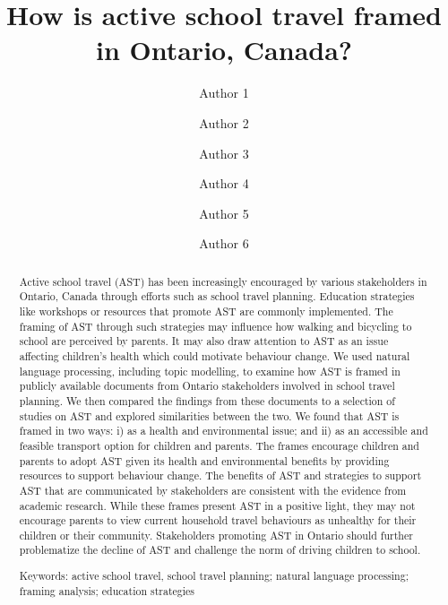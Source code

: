 \documentclass[]{elsarticle} %
\begin{document}
\begin{frontmatter}

  \title{How is active school travel framed in Ontario, Canada?}
    \author[Some Department]{Author 1}
    \author[Some Department]{Author 2}
    \author[Another University]{Author 3}
    \author[Some Institute]{Author 4}
    \author[Some University]{Author 5}
    \author[Some Department]{Author 6}
      \address[Some Department]{Department, Street, City, Province,
Postal Code}
    \address[Another University]{Department, Street, City, Province,
Postal Code}
    \address[Some Institute]{Street, City, Province, Postal Code}
    \address[Some University]{Department, Street, City, Province, Postal
Code}
  
  \begin{abstract}
  Active school travel (AST) has been increasingly encouraged by various
  stakeholders in Ontario, Canada through efforts such as school travel
  planning. Education strategies like workshops or resources that
  promote AST are commonly implemented. The framing of AST through such
  strategies may influence how walking and bicycling to school are
  perceived by parents. It may also draw attention to AST as an issue
  affecting children's health which could motivate behaviour change. We
  used natural language processing, including topic modelling, to
  examine how AST is framed in publicly available documents from Ontario
  stakeholders involved in school travel planning. We then compared the
  findings from these documents to a selection of studies on AST and
  explored similarities between the two. We found that AST is framed in
  two ways: i) as a health and environmental issue; and ii) as an
  accessible and feasible transport option for children and parents. The
  frames encourage children and parents to adopt AST given its health
  and environmental benefits by providing resources to support behaviour
  change. The benefits of AST and strategies to support AST that are
  communicated by stakeholders are consistent with the evidence from
  academic research. While these frames present AST in a positive light,
  they may not encourage parents to view current household travel
  behaviours as unhealthy for their children or their community.
  Stakeholders promoting AST in Ontario should further problematize the
  decline of AST and challenge the norm of driving children to school.

  Keywords: active school travel, school travel planning; natural
  language processing; framing analysis; education strategies
  \end{abstract}
  
 \end{frontmatter}
\end{document}

